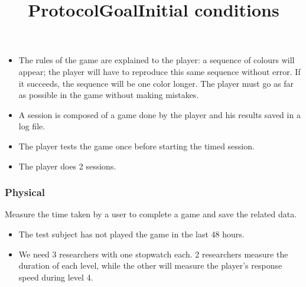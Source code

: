 \documentclass[12pt, openany, twocolumn]{article}
\begin{document}
            \noindent \title{\textbf{Protocol}}
                \begin{itemize}
                \renewcommand\labelitemi{--}
                    \item{The rules of the game are explained to the player: a sequence of colours will appear; the player will have to reproduce this same sequence without error. If it succeeds, the sequence will be one color longer. The player must go as far as possible in the game without making mistakes.}
                    \item{A session is composed of a game done by the player and his results saved in a log file.}
                    \item{The player tests the game once before starting the timed session.}
                    \item{The player does 2 sessions.}
                \end{itemize}

        \subsubsection{Physical}
            \title{\textbf{Goal}} \vspace{0.25cm}

            \noindent Measure the time taken by a user to complete a game and save the related data.
            \\

            \noindent \title{\textbf{Initial conditions}}
                \begin{itemize}
                \renewcommand\labelitemi{--}
                    \item{The test subject has not played the game in the last 48 hours.}
                    \item{We need 3 researchers with one stopwatch each. 2 researchers measure the duration of each level, while the other will measure the player's response speed during level 4.}
                \end{itemize}
            
\end{document}
